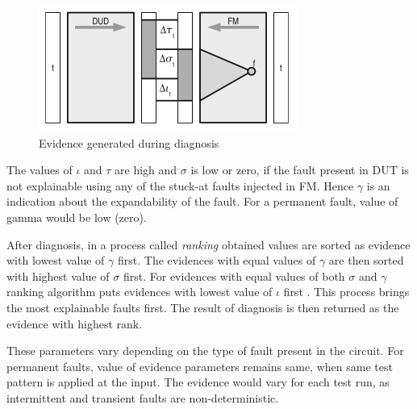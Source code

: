 \begin{figure}[h]
  \begin{center}
    \captionsetup{justification=centering}
    \includegraphics[scale=1.00]{figures/evidance.png}
    \caption{Evidence generated during diagnosis \cite{Holst2009}}
    \label{fig:evidance}
  \end{center}
\end{figure}

The values of $\iota$ and $\tau$ are high and $\sigma$ is low or zero, if the fault present in DUT is not explainable using any of the stuck-at faults injected in FM. Hence $\gamma$ is an indication about the expandability of the fault. For a permanent fault, value of gamma would be low (zero). 

After diagnosis, in a process called \emph{ranking} obtained values are sorted as evidence with lowest value of $\gamma$ first. The evidences with equal values of $\gamma$ are then sorted with highest value of $\sigma$ first. For evidences with equal values of both $\sigma$ and $\gamma$ ranking algorithm puts evidences with lowest value of $\iota$ first \cite{Holst2009}. This process brings the most explainable faults first. The result of diagnosis is then returned as the evidence with highest rank.

These parameters vary depending on the type of fault present in the circuit. For permanent faults, value of evidence parameters remains same, when same test pattern is applied at the input. The evidence would vary for each test run, as intermittent and transient faults are non-deterministic.



